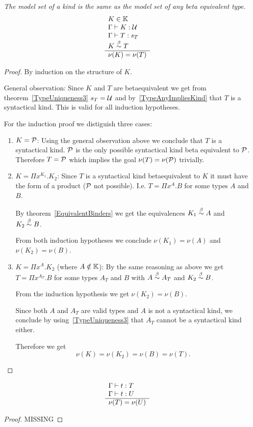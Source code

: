 \begin{lemma}
    \label{ModelEquivalentKinds}
    \emph{The model set of a kind is the same as the model set of any beta
    equivalent type}.
    $$
    \begin{array}{l} 
        K \in \mathbb{K}
        \\
        \Gamma \vdash K: {\cal U}
        \\
        \Gamma \vdash T: s_T
        \\
        K \stackrel{\beta}{\sim} T
     \\ \hline 
        \nu(K) = \nu(T)
    \end{array}
    $$

    \begin{proof}
        By induction on the structure of $K$.

        General observation: Since $K$ and $T$ are betaequivalent we get from
        theorem~\ref{TypeUniqueness3} $s_T = {\cal U}$ and
        by~\ref{TypeAnyImpliesKind} that $T$ is a syntactical kind. This is
        valid for all induction hypotheses.

        For the induction proof we distiguish three cases:
        \begin{enumerate}
        \item $K = {\cal P}$: Using the general observation above we conclude that
            $T$ is a syntactical kind. ${\cal P}$ is the only possible syntactical
                kind beta equivalent to ${\cal P}$. Therefore $T = {\cal P}$ which
                implies the goal $\nu(T) = \nu({\cal P})$ trivially.

        \item $K = \Pi x^{K_1}. K_2$:
            Since $T$ is a syntactical kind betaequivalent to $K$ it must have
                the form of a product (${\cal P}$ not possible). I.e. $T = \Pi
                x^A.B$ for some types $A$ and $B$.

            By theorem~\ref{EquivalentBinders} we get the equivalences $K_1
                \stackrel{\beta}{\sim} A$ and $K_2 \stackrel{\beta}{\sim} B$.

            From both induction hypotheses we conclude $\nu(K_1) = \nu(A)$ and
            $\nu(K_2) = \nu(B)$.


        \item $K = \Pi x^A . K_2$ (where $A \notin \mathbb{K}$):
            By the same reasoning as above we get $T = \Pi x^{A_T}.B$ for some
            types $A_T$ and $B$ with $A \stackrel{\beta}{\sim} A_T$ and $ K_2 \stackrel{\beta}{\sim} B$.

                From the induction hypothesis we get $\nu(K_2) = \nu(B)$.

            Since both $A$ and $A_T$ are valid types and $A$ is not a
                syntactical kind, we conclude by using~\ref{TypeUniqueness3}
                that $A_T$ cannot be a syntactical kind either.

            Therefore we get
            $$
                \nu(K) = \nu(K_2) = \nu(B) = \nu(T).
            $$
        \end{enumerate}
    \end{proof}
\end{lemma}


\begin{theorem}
    $$
        \begin{array}{l} 
            \Gamma \vdash t: T
            \\
            \Gamma \vdash t: U
         \\ \hline 
            \nu(T) = \nu(U)
        \end{array}
    $$

    \begin{proof}
        MISSING
    \end{proof}
\end{theorem}


